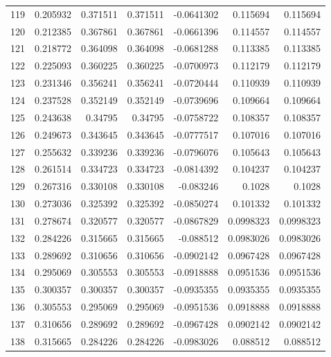 \begin{tabular}{rrrrrrr}
 119 &  0.205932    & 0.371511    & 0.371511    & -0.0641302   & 0.115694    & 0.115694    \\
 120 &  0.212385    & 0.367861    & 0.367861    & -0.0661396   & 0.114557    & 0.114557    \\
 121 &  0.218772    & 0.364098    & 0.364098    & -0.0681288   & 0.113385    & 0.113385    \\
 122 &  0.225093    & 0.360225    & 0.360225    & -0.0700973   & 0.112179    & 0.112179    \\
 123 &  0.231346    & 0.356241    & 0.356241    & -0.0720444   & 0.110939    & 0.110939    \\
 124 &  0.237528    & 0.352149    & 0.352149    & -0.0739696   & 0.109664    & 0.109664    \\
 125 &  0.243638    & 0.34795     & 0.34795     & -0.0758722   & 0.108357    & 0.108357    \\
 126 &  0.249673    & 0.343645    & 0.343645    & -0.0777517   & 0.107016    & 0.107016    \\
 127 &  0.255632    & 0.339236    & 0.339236    & -0.0796076   & 0.105643    & 0.105643    \\
 128 &  0.261514    & 0.334723    & 0.334723    & -0.0814392   & 0.104237    & 0.104237    \\
 129 &  0.267316    & 0.330108    & 0.330108    & -0.083246    & 0.1028      & 0.1028      \\
 130 &  0.273036    & 0.325392    & 0.325392    & -0.0850274   & 0.101332    & 0.101332    \\
 131 &  0.278674    & 0.320577    & 0.320577    & -0.0867829   & 0.0998323   & 0.0998323   \\
 132 &  0.284226    & 0.315665    & 0.315665    & -0.088512    & 0.0983026   & 0.0983026   \\
 133 &  0.289692    & 0.310656    & 0.310656    & -0.0902142   & 0.0967428   & 0.0967428   \\
 134 &  0.295069    & 0.305553    & 0.305553    & -0.0918888   & 0.0951536   & 0.0951536   \\
 135 &  0.300357    & 0.300357    & 0.300357    & -0.0935355   & 0.0935355   & 0.0935355   \\
 136 &  0.305553    & 0.295069    & 0.295069    & -0.0951536   & 0.0918888   & 0.0918888   \\
 137 &  0.310656    & 0.289692    & 0.289692    & -0.0967428   & 0.0902142   & 0.0902142   \\
 138 &  0.315665    & 0.284226    & 0.284226    & -0.0983026   & 0.088512    & 0.088512    \\

\end{tabular}
